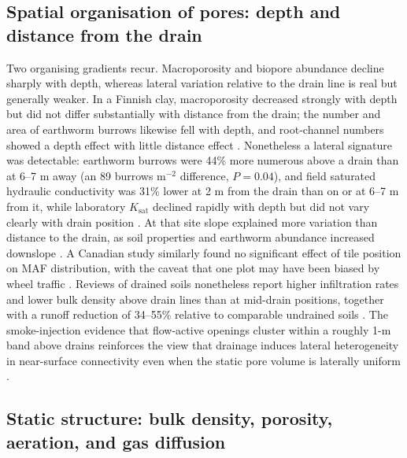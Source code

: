 \documentclass[11pt]{article}
\begin{document}
\subsection{Spatial organisation of pores: depth and distance from the drain}

Two organising gradients recur. Macroporosity and biopore abundance decline sharply
with depth, whereas lateral variation relative to the drain line is real but
generally weaker. In a Finnish clay, macroporosity decreased strongly with depth but
did not differ substantially with distance from the drain; the number and area of
earthworm burrows likewise fell with depth, and root-channel numbers showed a depth
effect with little distance effect \parencite{Alakukku2010}. Nonetheless a lateral
signature was detectable: earthworm burrows were 44\% more numerous above a drain
than at 6--7 m away (an 89 burrows m$^{-2}$ difference, $P = 0.04$), and field
saturated hydraulic conductivity was 31\% lower at 2 m from the drain than on or at
6--7 m from it, while laboratory $K_{\mathrm{sat}}$ declined rapidly with depth but
did not vary clearly with drain position \parencite{Alakukku2010}. At that site slope
explained more variation than distance to the drain, as soil properties and earthworm
abundance increased downslope \parencite{Alakukku2010}. A Canadian study similarly
found no significant effect of tile position on MAF distribution, with the caveat
that one plot may have been biased by wheel traffic \parencite{Frey2011}. Reviews of
drained soils nonetheless report higher infiltration rates and lower bulk density
above drain lines than at mid-drain positions, together with a runoff reduction of
34--55\% relative to comparable undrained soils \parencite{Montagne2009}. The
smoke-injection evidence that flow-active openings cluster within a roughly 1-m band
above drains reinforces the view that drainage induces lateral heterogeneity in
near-surface connectivity even when the static pore volume is laterally uniform
\parencite{Nielsen2015,Petersen2012}.

\subsection{Static structure: bulk density, porosity, aeration, and gas diffusion}
\end{document}
